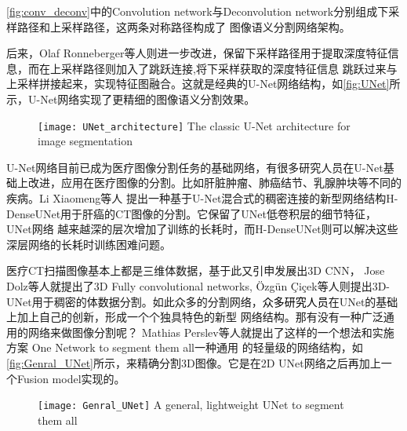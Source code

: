 	\autoref{fig:conv_deconv}中的Convolution network与Deconvolution network分别组成下采样路径和上采样路径，这两条对称路径构成了
	图像语义分割网络架构。
	
	后来，Olaf Ronneberger等人\cite{ronneberger2015u}则进一步改进，保留下采样路径用于提取深度特征信息，而在上采样路径则加入了跳跃连接,将下采样获取的深度特征信息
	跳跃过来与上采样拼接起来，实现特征图融合。这就是经典的U-Net网络结构，如\autoref{fig:UNet}所示，U-Net网络实现了更精细的图像语义分割效果。
	
	\begin{figure}[!htp]
		\centering
		\texttt{[image: UNet\_architecture]}
			{The classic U-Net architecture for image segmentation}
		\label{fig:UNet}
	\end{figure}
	
	U-Net网络目前已成为医疗图像分割任务的基础网络，有很多研究人员在U-Net基础上改进，应用在医疗图像的分割。比如肝脏肿瘤、肺癌结节、乳腺肿块等不同的疾病。Li Xiaomeng等人
	\cite{Li2017HDenseUNetHD}提出一种基于U-Net混合式的稠密连接的新型网络结构H-DenseUNet用于肝癌的CT图像的分割。它保留了UNet低卷积层的细节特征，UNet网络
	越来越深的层次增加了训练的长耗时，而H-DenseUNet则可以解决这些深层网络的长耗时训练困难问题。
	
	医疗CT扫描图像基本上都是三维体数据，基于此又引申发展出3D CNN， Jose Dolz等人\cite{Dolze3DFCN}就提出了3D Fully convolutional networks, 
	{\"O}zg{\"u}n {\c{C}}i{\c{c}}ek等人\cite{cciccek20163d}则提出3D-UNet用于稠密的体数据分割。如此众多的分割网络，\textcolor{black}{众多研究人员}在UNet的基础上加上自己的创新，形成一个个独具特色的新型
	网络结构。那有没有一种广泛通用的网络来做图像分割呢？ Mathias Perslev等人\cite{PerslevGeneralUNetFusion}就提出了这样的一个想法和实施方案
	One Network to segment them all一种通用	的轻量级的网络结构，如\autoref{fig:Genral_UNet}所示，来精确分割3D图像。它是在2D UNet网络之后再加上一个Fusion model实现的。
	\begin{figure}[!htp]
		\centering
		\texttt{[image: Genral\_UNet]}
			{A general, lightweight UNet to segment them all}
		\label{fig:Genral_UNet}
	\end{figure}
	
